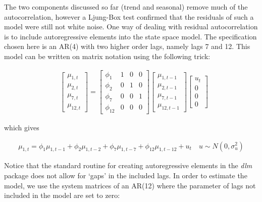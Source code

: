 \documentclass[12pt, a4paper]{article}
\begin{document}
The two components discussed so far (trend and seasonal) remove much of
the autocorrelation, however a Ljung-Box test confirmed that the
residuals of such a model were still not white noise. One
way of dealing with residual autocorrelation is to include
autoregressive elements into the state space model. The specification chosen here is
an AR(4) with two higher order lags, namely lags 7 and 12. This model can be written on matrix notation using the following trick:

\begin{align*}
&\begin{bmatrix}
 \mu_{1,t} \\ \mu_{2,t} \\ \mu_{7,t} \\ \mu_{12,t} 
\end{bmatrix} =  \begin{bmatrix} 
\phi_{1} & 1 & 0 & 0 \\ 
\phi_{2} & 0 & 1 & 0 \\
\phi_{7} & 0 & 0 & 1 \\
\phi_{12} & 0 & 0 & 0 
\end{bmatrix} \begin{bmatrix} 
\mu_{1,t-1} \\ \mu_{2,t-1} \\ \mu_{7,t-1} \\ \mu_{12,t-1} 
\end{bmatrix} \begin{bmatrix}
u_{t} \\ 0 \\ 0 \\ 0 
\end{bmatrix}
\end{align*}

which gives

\begin{align}
\mu_{1,t} = \phi_{1} \mu_{1,t-1} + \phi_{2} \mu_{1,t-2} + \phi_{7} \mu_{1,t-7} + \phi_{12} \mu_{1,t-12} + u_{t} \quad u \sim N(0, \sigma^{2}_{u})
\end{align}

Notice that the standard routine for creating autoregressive elements in
the \emph{dlm} package does not allow for `gaps' in the included lags. In
order to estimate the model, we use the system matrices of
an AR(12) where the parameter of lags not included in the model are set
to zero:
\end{document}
